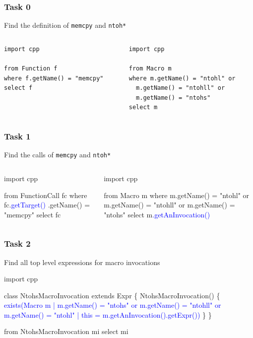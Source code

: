 \documentclass[usenames,dvipsnames]{beamer}
\newcommand{\bluealert}[1] {\alert{\textcolor{blue}{#1}}}
\begin{document}
\begin{frame}[fragile]
\frametitle{Task 0}
  Find the definition of \texttt{memcpy} and \texttt{ntoh*}
  \footnotesize
  \begin{columns}
    \begin{column}{0.5\textwidth}
      \begin{verbatim}
import cpp

from Function f
where f.getName() = "memcpy"
select f
      \end{verbatim}
    \end{column}
    \begin{column}{0.5\textwidth}
      \begin{verbatim}
import cpp

from Macro m
where m.getName() = "ntohl" or 
  m.getName() = "ntohll" or
  m.getName() = "ntohs"
select m
      \end{verbatim}
    \end{column}
  \end{columns}

\end{frame}

\begin{frame}[fragile]
\frametitle{Task 1}
  Find the calls of \texttt{memcpy} and \texttt{ntoh*}
  \footnotesize
  \begin{columns}
    \begin{column}{0.5\textwidth}
      \begin{semiverbatim}
import cpp

from FunctionCall fc
where fc.\bluealert{getTarget()}
  .getName() = "memcpy"
select fc
      \end{semiverbatim}
    \end{column}
    \begin{column}{0.5\textwidth}
      \begin{semiverbatim}
import cpp

from Macro m
where m.getName() = "ntohl" or 
  m.getName() = "ntohll" or
  m.getName() = "ntohs" 
select m\bluealert{.getAnInvocation()}  
      \end{semiverbatim}
    \end{column}
  \end{columns}
\end{frame}

\begin{frame}[fragile]
\frametitle{Task 2}
Find all top level expressions for macro invocations
\footnotesize
\begin{semiverbatim}
import cpp

class NtohsMacroInvocation extends Expr \{
  NtohsMacroInvocation() \{ 
      \bluealert{exists(Macro m | m.getName() = "ntohs"  or}
      \bluealert{  m.getName() = "ntohll" or}
      \bluealert{    m.getName() = "ntohl"}
      \bluealert{  | this = m.getAnInvocation().getExpr())}
    \}
\}

from NtohsMacroInvocation mi
select mi
\end{semiverbatim}
\end{frame}
\end{document}
